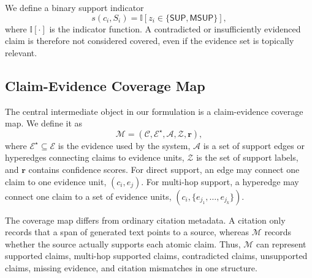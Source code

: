 We define a binary support indicator
\begin{equation}
    s(c_i, S_i) =
    \mathbb{I}\left[z_i \in \{\mathsf{SUP}, \mathsf{MSUP}\}\right],
    \label{eq:support_indicator}
\end{equation}
where $\mathbb{I}[\cdot]$ is the indicator function. A contradicted or insufficiently evidenced claim is therefore not considered covered, even if the evidence set is topically relevant.

\subsection{Claim-Evidence Coverage Map}
\label{subsec:coverage_map}

The central intermediate object in our formulation is a claim-evidence coverage map. We define it as
\begin{equation}
    \mathcal{M} = (\mathcal{C}, \mathcal{E}^{\star}, \mathcal{A}, \mathcal{Z}, \mathbf{r}),
    \label{eq:coverage_map}
\end{equation}
where $\mathcal{E}^{\star} \subseteq \mathcal{E}$ is the evidence used by the system, $\mathcal{A}$ is a set of support edges or hyperedges connecting claims to evidence units, $\mathcal{Z}$ is the set of support labels, and $\mathbf{r}$ contains confidence scores. For direct support, an edge may connect one claim to one evidence unit, $(c_i, e_j)$. For multi-hop support, a hyperedge may connect one claim to a set of evidence units, $(c_i, \{e_{j_1}, \ldots, e_{j_k}\})$.

The coverage map differs from ordinary citation metadata. A citation only records that a span of generated text points to a source, whereas $\mathcal{M}$ records whether the source actually supports each atomic claim. Thus, $\mathcal{M}$ can represent supported claims, multi-hop supported claims, contradicted claims, unsupported claims, missing evidence, and citation mismatches in one structure.

